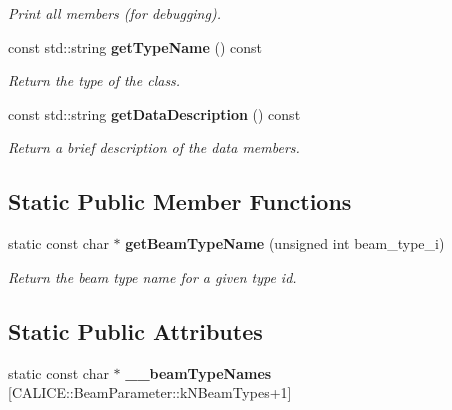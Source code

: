 \begin{DoxyCompactItemize}
\begin{DoxyCompactList}\small\item\em Print all members (for debugging). \item\end{DoxyCompactList}\item 
const std::string {\bf getTypeName} () const \label{classCALICE_1_1BeamParameter_aa5a1c4f371d71c513584a106f69ee940}

\begin{DoxyCompactList}\small\item\em Return the type of the class. \item\end{DoxyCompactList}\item 
const std::string {\bf getDataDescription} () const \label{classCALICE_1_1BeamParameter_adf804091f7b3991b2dbec8bc9b5db5fb}

\begin{DoxyCompactList}\small\item\em Return a brief description of the data members. \item\end{DoxyCompactList}\end{DoxyCompactItemize}
\subsection*{Static Public Member Functions}
\begin{DoxyCompactItemize}
\item 
static const char $\ast$ {\bf getBeamTypeName} (unsigned int beam\_\-type\_\-i)\label{classCALICE_1_1BeamParameter_add13ac5aa7c9fab9a5572f6673ff8dc6}

\begin{DoxyCompactList}\small\item\em Return the beam type name for a given type id. \item\end{DoxyCompactList}\end{DoxyCompactItemize}
\subsection*{Static Public Attributes}
\begin{DoxyCompactItemize}
\item 
static const char $\ast$ {\bfseries \_\-\_\-beamTypeNames} [CALICE::BeamParameter::kNBeamTypes+1]
\end{DoxyCompactItemize}


